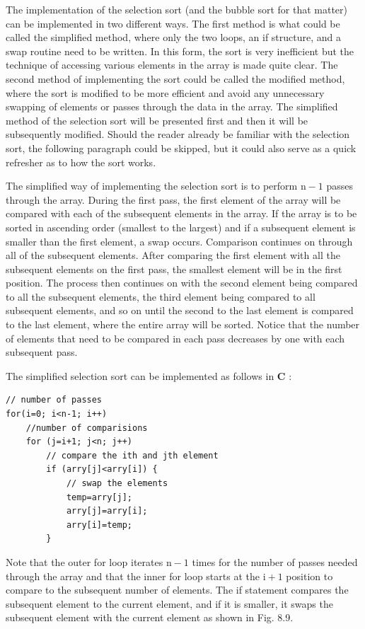 \documentclass[10pt]{article}
\begin{document}
The implementation of the selection sort (and the bubble sort for that matter) can be implemented in two different ways. The first method is what could be called the simplified method, where only the two loops, an if structure, and a swap routine need to be written. In this form, the sort is very inefficient but the technique of accessing various elements in the array is made quite clear. The second method of implementing the sort could be called the modified method, where the sort is modified to be more efficient and avoid any unnecessary swapping of elements or passes through the data in the array. The simplified method of the selection sort will be presented first and then it will be subsequently modified. Should the reader already be familiar with the selection sort, the following paragraph could be skipped, but it could also serve as a quick refresher as to how the sort works.

The simplified way of implementing the selection sort is to perform $\mathrm{n}-1$ passes through the array. During the first pass, the first element of the array will be compared with each of the subsequent elements in the array. If the array is to be\\
sorted in ascending order (smallest to the largest) and if a subsequent element is smaller than the first element, a swap occurs. Comparison continues on through all of the subsequent elements. After comparing the first element with all the subsequent elements on the first pass, the smallest element will be in the first position. The process then continues on with the second element being compared to all the subsequent elements, the third element being compared to all subsequent elements, and so on until the second to the last element is compared to the last element, where the entire array will be sorted. Notice that the number of elements that need to be compared in each pass decreases by one with each subsequent pass.

The simplified selection sort can be implemented as follows in $\mathbf{C}$ :

\begin{verbatim}
// number of passes
for(i=0; i<n-1; i++)
    //number of comparisions
    for (j=i+1; j<n; j++)
        // compare the ith and jth element
        if (arry[j]<arry[i]) {
            // swap the elements
            temp=arry[j];
            arry[j]=arry[i];
            arry[i]=temp;
        }
\end{verbatim}

Note that the outer for loop iterates $\mathrm{n}-1$ times for the number of passes needed through the array and that the inner for loop starts at the $\mathrm{i}+1$ position to compare to the subsequent number of elements. The if statement compares the subsequent element to the current element, and if it is smaller, it swaps the subsequent element with the current element as shown in Fig. 8.9.
\end{document}
